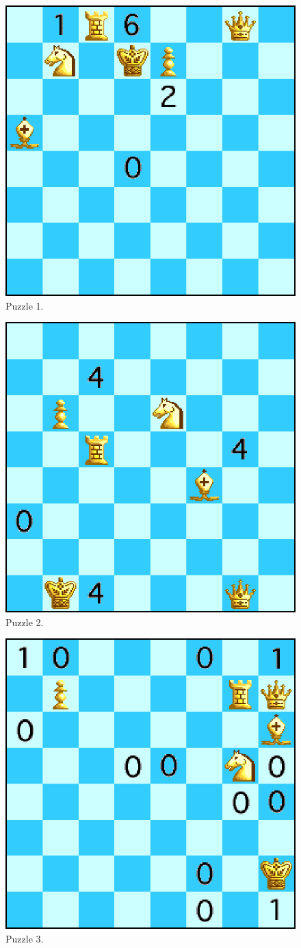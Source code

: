 \documentclass[runningheads]{llncs}
\begin{document}
\begin{figure}[H]
  \centering
  \includegraphics[width=0.6\linewidth]{figures/chessdemo.eps}
  \caption{Puzzle 1.}\label{fig:puzzle1}
\end{figure}

\begin{figure}[H]
  \centering
  \includegraphics[width=0.6\linewidth]{figures/chess2.eps}
  \caption{Puzzle 2.}\label{fig:puzzle2}
\end{figure}

\begin{figure}[H]
  \centering
  \includegraphics[width=0.6\linewidth]{figures/chess3.eps}
  \caption{Puzzle 3.}\label{fig:puzzle3}
\end{figure}
\end{document}
